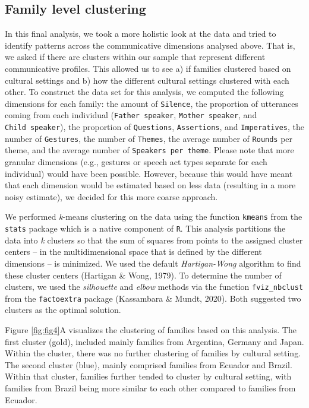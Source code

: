 \documentclass[
  man,floatsintext]{apa6}
\begin{document}
\hypertarget{family-level-clustering}{%
\subsection{Family level clustering}\label{family-level-clustering}}

In this final analysis, we took a more holistic look at the data and tried to identify patterns across the communicative dimensions analysed above. That is, we asked if there are clusters within our sample that represent different communicative profiles. This allowed us to see a) if families clustered based on cultural settings and b) how the different cultural settings clustered with each other. To construct the data set for this analysis, we computed the following dimensions for each family: the amount of \texttt{Silence}, the proportion of utterances coming from each individual (\texttt{Father\ speaker}, \texttt{Mother\ speaker}, and \texttt{Child\ speaker}), the proportion of \texttt{Questions}, \texttt{Assertions}, and \texttt{Imperatives}, the number of \texttt{Gestures}, the number of \texttt{Themes}, the average number of \texttt{Rounds} per theme, and the average number of \texttt{Speakers\ per\ theme}. Please note that more granular dimensions (e.g., gestures or speech act types separate for each individual) would have been possible. However, because this would have meant that each dimension would be estimated based on less data (resulting in a more noisy estimate), we decided for this more coarse approach.

We performed \emph{k}-means clustering on the data using the function \texttt{kmeans} from the \texttt{stats} package which is a native component of \texttt{R}. This analysis partitions the data into \emph{k} clusters so that the sum of squares from points to the assigned cluster centers -- in the multidimensional space that is defined by the different dimensions -- is minimized. We used the default \emph{Hartigan-Wong} algorithm to find these cluster centers (Hartigan \& Wong, 1979). To determine the number of clusters, we used the \emph{silhouette} and \emph{elbow} methods via the function \texttt{fviz\_nbclust} from the \texttt{factoextra} package (Kassambara \& Mundt, 2020). Both suggested two clusters as the optimal solution.

Figure \ref{fig:fig4}A visualizes the clustering of families based on this analysis. The first cluster (gold), included mainly families from Argentina, Germany and Japan. Within the cluster, there was no further clustering of families by cultural setting. The second cluster (blue), mainly comprised families from Ecuador and Brazil. Within that cluster, families further tended to cluster by cultural setting, with families from Brazil being more similar to each other compared to families from Ecuador.
\end{document}
